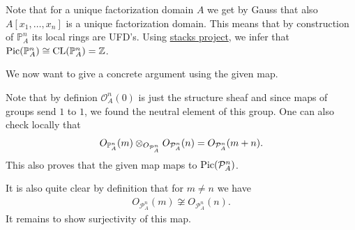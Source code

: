\begin{exercise}{2}
    Note that for a unique factorization domain $A$ we get by Gauss that also
    $A[x_1,\dots, x_n]$ is a unique factorization domain. This means that by
    construction of $\mathbb{P}_A^n$ its local rings are UFD's. Using
    \href{https://stacks.math.columbia.edu/tag/0BE9}{stacks project}, we infer
    that $\operatorname{Pic}(\mathbb{P}_A^n)\cong \operatorname{CL}(\mathbb{P}_A^n)=\mathbb{Z}$.

    We now want to give a concrete argument using the given map.

    Note that by definion $\mathcal{O}^n_A(0)$ is just the structure sheaf and
    since maps of groups send $1$ to $1$, we found the neutral element of this
    group. One can also check locally that 
    \begin{align*}
       O_{\mathbb{P}^n_A}(m)\otimes_{O_{\mathcal{P}^n_A}} O_{\mathcal{P}^n_A}(n) =
        O_{\mathcal{P}^n_A}(m+n).
    \end{align*}
    This also proves that the given map maps to $\operatorname{Pic}(\mathcal{P}^n_A)$.

    It is also quite clear by definition that for $m\not=n$ we have
    \begin{align}
        O_{\mathcal{P}^n_A}(m)\not \cong O_{\mathcal{P}^n_A}(n).
    \end{align}
    It remains to show surjectivity of this map.
\end{exercise}

